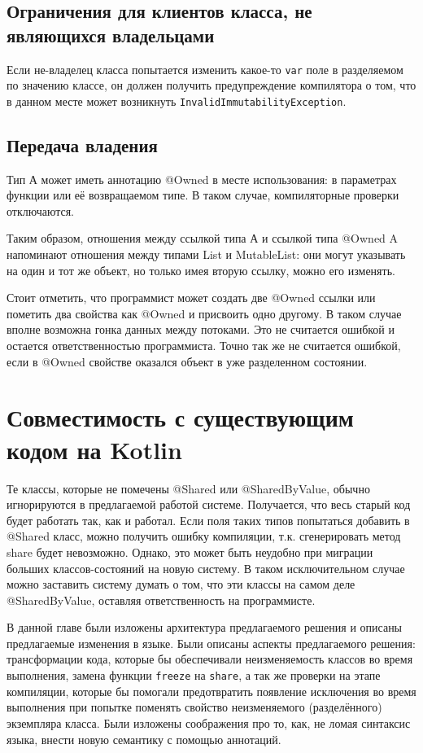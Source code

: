 \documentclass[specification,annotation,times]{itmo-student-thesis}
\begin{document}
\subsection{Ограничения для клиентов класса, не являющихся владельцами}

Если не-владелец класса попытается изменить какое-то \texttt{var} поле в разделяемом по значению классе, он должен получить предупреждение компилятора о том, что в данном месте может возникнуть \texttt{InvalidImmutabilityException}.

\subsection{Передача владения}

Тип А может иметь аннотацию @Owned в месте использования: в параметрах функции или её возвращаемом типе. В таком случае, компиляторные проверки отключаются.

Таким образом, отношения между ссылкой типа А и ссылкой типа @Owned A напоминают отношения между типами List и MutableList: они могут указывать на один и тот же объект, но только имея вторую ссылку, можно его изменять.

Стоит отметить, что программист может создать две @Owned ссылки или пометить два свойства как @Owned и присвоить одно другому. В таком случае вполне возможна гонка данных между потоками. Это не считается ошибкой и остается ответственностью программиста.
Точно так же не считается ошибкой, если в @Owned свойстве оказался объект в уже разделенном состоянии.

\section{Совместимость с существующим кодом на Kotlin}\label{backwards_compat}

Те классы, которые не помечены @Shared или @SharedByValue, обычно игнорируются в предлагаемой работой системе.
Получается, что весь старый код будет работать так, как и работал.
Если поля таких типов попытаться добавить в @Shared класс, можно получить ошибку компиляции, т.к. сгенерировать метод share будет невозможно.
Однако, это может быть неудобно при миграции больших классов-состояний на новую систему.
В таком исключительном случае можно заставить систему думать о том, что эти классы на самом деле @SharedByValue, оставляя ответственность на программисте.

\chapterconclusion

В данной главе были изложены архитектура предлагаемого решения и описаны предлагаемые изменения в языке.
Были описаны аспекты предлагаемого решения: трансформации кода, которые бы обеспечивали неизменяемость классов во время выполнения, замена функции \texttt{freeze} на \texttt{share}, а так же проверки на этапе компиляции, которые бы помогали предотвратить появление исключения во время выполнения при попытке поменять свойство неизменяемого (разделённого) экземпляра класса.
Были изложены соображения про то, как, не ломая синтаксис языка, внести новую семантику с помощью аннотаций.
\end{document}
